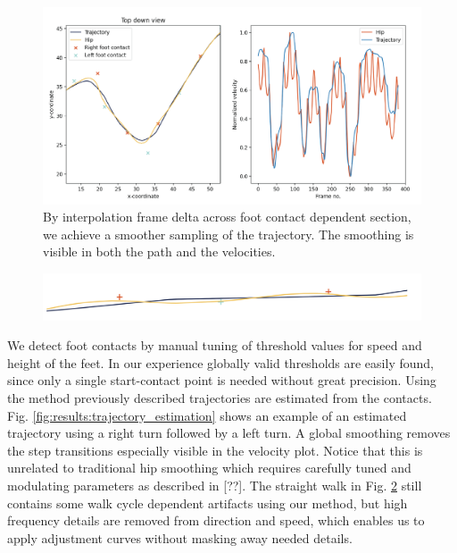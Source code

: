 \begin{figure}
    \centering
    \includegraphics[width=1.0\columnwidth]{img/trajectory_estimation_smooth.png}
    \caption{By interpolation frame delta across foot contact dependent section, we achieve a smoother sampling of the trajectory. The smoothing is visible in both the path and the velocities.}
    \label{fig:results:trajectory_estimation_smooth}
\end{figure}

\begin{figure}
    \centering
    \includegraphics[width=1.0\columnwidth]{img/straight_trajectory.png}
    \caption{}
    \label{fig:results:trajectory_straight}
\end{figure}
We detect foot contacts by manual tuning of threshold values for speed and height of the feet. In our experience globally valid thresholds are easily found, since only a single start-contact point is needed without great precision. Using the method previously described trajectories are estimated from the contacts. Fig. \ref{fig:results:trajectory_estimation} shows an example of an estimated trajectory using a right turn followed by a left turn. A global smoothing removes the step transitions especially visible in the velocity plot. Notice that this is unrelated to traditional hip smoothing which requires carefully tuned and modulating parameters as described in [??]. The straight walk in Fig. \ref{fig:results:trajectory_straight} still contains some walk cycle dependent artifacts using our method, but high frequency details are removed from direction and speed, which enables us to apply adjustment curves without masking away needed details. 

